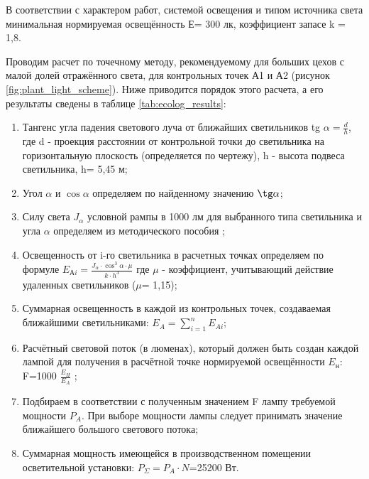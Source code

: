 В соответствии с характером работ, системой освещения и типом источника света минимальная нормируемая освещённость Е= 300 лк, коэффициент запасе k = 1,8.

Проводим расчет по точечному методу, рекомендуемому для больших цехов с малой долей отражённого света, для контрольных точек А1 и А2 (рисунок \ref{fig:plant_light_scheme}). Ниже приводится порядок этого расчета, а его результаты сведены в таблице \ref{tab:ecolog_results}:
\begin{enumerate}[1.]
	\item Тангенс угла падения светового луча от ближайших светильников tg $\alpha=\frac{d}{h}$, где d - проекция расстоянии от контрольной точки до светильника на горизонтальную плоскость (определяется по чертежу), h - высота подвеса светильника, h= 5,45 м;
	\item Угол $\alpha$ и $\cos \alpha$ определяем по найденному значению $\tg \alpha$;
	\item Силу света $J_\alpha$ условной рампы в 1000 лм для выбранного типа светильника и угла $\alpha$ определяем из методического пособия  \cite{ECO};
	\item Освещенность от i-го светильника в расчетных точках определяем по формуле $E_{Аi}=\frac{J_\alpha \cdot \cos^3 \alpha \cdot \mu}{k \cdot h^3 } $ где $\mu$ - коэффициент, учитывающий действие удаленных светильников ($\mu$= 1,15);
	\item Суммарная освещенность в каждой из контрольных точек, создаваемая ближайшими светильниками: $E_A = \sum_{i=1}^n E_{Ai} $;
	\item Расчётный световой поток (в люменах), который должен быть создан каждой лампой для получения в расчётной точке нормируемой освещённости $E_\text{н}$: F=1000 $\frac{E_H}{E_A}$ ;
	\item Подбираем в соответствии с полученным значением F лампу требуемой мощности $P_A$. При выборе мощности лампы следует принимать значение ближайшего большого светового потока;
	\item Суммарная мощность имеющейся в производственном помещении осветительной установки: $P_\Sigma = P_A \cdot N $=25200 Вт.
\end{enumerate}

